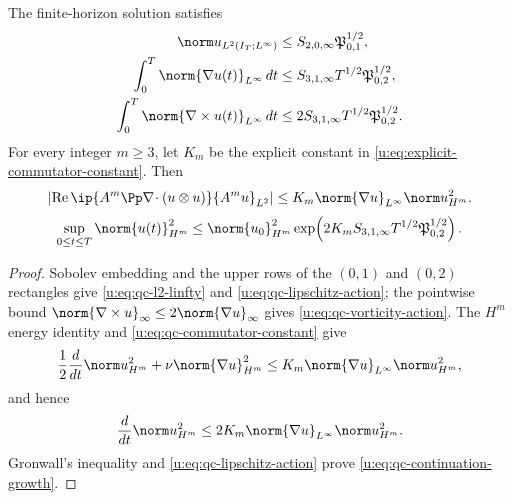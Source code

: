\begin{proposition}
\label{u:prop:qc-continuation-norms}
The finite-horizon solution satisfies
\begin{align}
 \norm u_{L^2(I_T;L^\infty)}
 &\le S_{2,0,\infty}\mathfrak P_{0,1}^{1/2},
 \label{u:eq:qc-l2-linfty}\\
 \int_0^T\norm{\nabla u(t)}_{L^\infty}\,dt
 &\le S_{3,1,\infty}T^{1/2}\mathfrak P_{0,2}^{1/2},
 \label{u:eq:qc-lipschitz-action}\\
 \int_0^T\norm{\nabla\times u(t)}_{L^\infty}\,dt
 &\le 2S_{3,1,\infty}T^{1/2}\mathfrak P_{0,2}^{1/2}.
 \label{u:eq:qc-vorticity-action}
\end{align}
For every integer \(m\ge3\), let \(K_m\) be the explicit constant in
\eqref{u:eq:explicit-commutator-constant}.  Then
\begin{equation}
 \left|\operatorname{Re}
 \ip{A^m\Pp\nabla\!\cdot(u\otimes u)}{A^m u}_{L^2}\right|
 \le K_m\norm{\nabla u}_{L^\infty}\norm u_{H^m}^2.
 \label{u:eq:qc-commutator-constant}
\end{equation}
\begin{equation}
 \sup_{0\le t\le T}\norm{u(t)}_{H^m}^2
 \le
 \norm{u_0}_{H^m}^2
 \exp\!\left(
 2K_mS_{3,1,\infty}T^{1/2}\mathfrak P_{0,2}^{1/2}
 \right).
 \label{u:eq:qc-continuation-growth}
\end{equation}
\end{proposition}

\begin{proof}
Sobolev embedding and the upper rows of the \((0,1)\) and \((0,2)\)
rectangles give \eqref{u:eq:qc-l2-linfty} and
\eqref{u:eq:qc-lipschitz-action}; the pointwise bound
\(\norm{\nabla\times u}_\infty\le2\norm{\nabla u}_\infty\) gives
\eqref{u:eq:qc-vorticity-action}.  The \(H^m\) energy identity and
\eqref{u:eq:qc-commutator-constant} give
\[
 \frac12\frac d{dt}\norm u_{H^m}^2
 +\nu\norm{\nabla u}_{H^m}^2
 \le K_m\norm{\nabla u}_{L^\infty}\norm u_{H^m}^2,
\]
and hence
\[
 \frac d{dt}\norm u_{H^m}^2
 \le2K_m\norm{\nabla u}_{L^\infty}\norm u_{H^m}^2.
\]
Gronwall's inequality and \eqref{u:eq:qc-lipschitz-action} prove
\eqref{u:eq:qc-continuation-growth}.
\end{proof}

